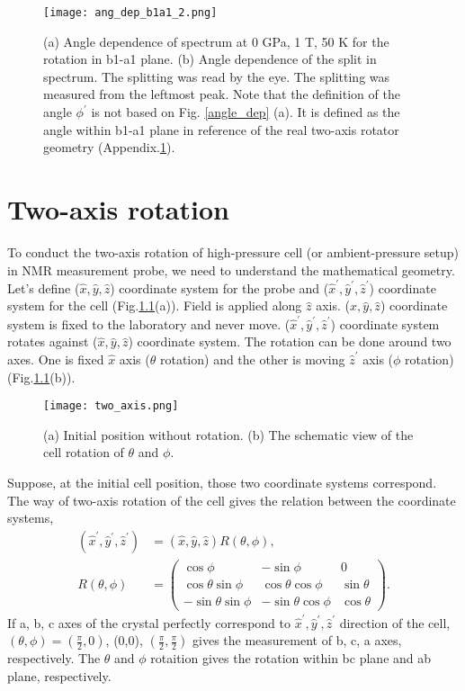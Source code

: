 \documentclass[a4,10.5pt]{report}
\begin{document}
\begin{figure}
  \centering
  \texttt{[image: ang\_dep\_b1a1\_2.png]}
  \caption{(a) Angle dependence of spectrum at 0 GPa, 1 T, 50 K for the rotation in b1-a1 plane.
  (b) Angle dependence of the split in spectrum. 
  The splitting was read by the eye.
  The splitting was measured from the leftmost peak.
  Note that the definition of the angle $\phi^\prime$ is not based on Fig. \ref{angle_dep} (a).
  It is defined as the angle within b1-a1 plane in reference of the real two-axis rotator geometry (Appendix.\ref{two-axis}).}
  \label{b1a1}
\end{figure}

\chapter{Two-axis rotation}
\label{two-axis}
To conduct the two-axis rotation of high-pressure cell (or ambient-pressure setup) in NMR measurement probe, we need to understand the mathematical geometry.
Let's define ($\hat{x}, \hat{y}, \hat{z}$) coordinate system for the probe and ($\hat{x}^\prime, \hat{y}^\prime, \hat{z}^\prime$) coordinate system for the cell 
(Fig.\ref{two_axis}(a)).
Field is applied along $\hat{z}$ axis.
($\hat{x}, \hat{y}, \hat{z}$) coordinate system is fixed to the laboratory and never move.
($\hat{x}^\prime, \hat{y}^\prime, \hat{z}^\prime$) coordinate system rotates against ($\hat{x}, \hat{y}, \hat{z}$) coordinate system.
The rotation can be done around two axes.
One is fixed $\hat{x}$ axis ($\theta$ rotation) and  the other is moving $\hat{z}^\prime$ axis ($\phi$ rotation) (Fig.\ref{two_axis}(b)).
\begin{figure}
  \centering
  \texttt{[image: two\_axis.png]}
  \caption{(a) Initial position without rotation.
  (b) The schematic view of the cell rotation of $\theta$ and $\phi$.}
  \label{two_axis}
\end{figure}
Suppose, at the initial cell position, those two coordinate systems correspond.
The way of two-axis rotation of the cell gives the relation between the coordinate systems,
\begin{align}
\label{coordinates}
(\hat{x}^\prime, \hat{y}^\prime, \hat{z}^\prime) &= (\hat{x}, \hat{y}, \hat{z}) R(\theta, \phi),\\
R(\theta, \phi) &=
\left(
\begin{array}{ccc}
\cos\phi & -\sin\phi & 0 \\
\cos\theta\sin\phi & \cos\theta\cos\phi & \sin\theta \\
-\sin\theta\sin\phi & -\sin\theta\cos\phi & \cos\theta
\end{array}
\right).
\end{align}
If a, b, c axes of the crystal perfectly correspond to $\hat{x}^\prime, \hat{y}^\prime, \hat{z}^\prime$ direction of the cell, $(\theta,\phi) = (\frac{\pi}{2},0)$,
(0,0), $(\frac{\pi}{2}, \frac{\pi}{2})$ gives the measurement of b, c, a axes, respectively.
The $\theta$ and $\phi$ rotaition gives the rotation within bc plane and ab plane, respectively.
\end{document}
